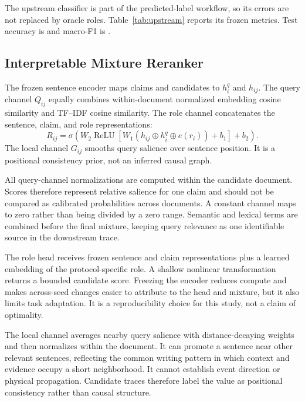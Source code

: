 \documentclass[applsci,article,submit,moreauthors]{Definitions/mdpi}
\begin{document}
The upstream classifier is part of the predicted-label workflow, so its errors are not replaced by oracle roles. Table~\ref{tab:upstream} reports its frozen metrics. Test accuracy is \UpstreamTestAccuracy{} and macro-F1 is \UpstreamTestMacroFOne{}.

\begin{table}[H]
\caption{Upstream role-prediction performance. All values are generated from the immutable metrics artifact.}\label{tab:upstream}
\centering\resizebox{\textwidth}{!}{}
\end{table}

\subsection{Interpretable Mixture Reranker}
The frozen sentence encoder maps claims and candidates to $h_i^q$ and $h_{ij}$. The query channel $Q_{ij}$ equally combines within-document normalized embedding cosine similarity and TF--IDF cosine similarity. The role channel concatenates the sentence, claim, and role representations:
\begin{equation}
R_{ij}=\sigma\!\left(W_2\operatorname{ReLU}\left[W_1(h_{ij}\oplus h_i^q\oplus e(r_i))+b_1\right]+b_2\right).
\end{equation}
The local channel $G_{ij}$ smooths query salience over sentence position. It is a positional consistency prior, not an inferred causal graph.

All query-channel normalizations are computed within the candidate document. Scores therefore represent relative salience for one claim and should not be compared as calibrated probabilities across documents. A constant channel maps to zero rather than being divided by a zero range. Semantic and lexical terms are combined before the final mixture, keeping query relevance as one identifiable source in the downstream trace.

The role head receives frozen sentence and claim representations plus a learned embedding of the protocol-specific role. A shallow nonlinear transformation returns a bounded candidate score. Freezing the encoder reduces compute and makes across-seed changes easier to attribute to the head and mixture, but it also limits task adaptation. It is a reproducibility choice for this study, not a claim of optimality.

The local channel averages nearby query salience with distance-decaying weights and then normalizes within the document. It can promote a sentence near other relevant sentences, reflecting the common writing pattern in which context and evidence occupy a short neighborhood. It cannot establish event direction or physical propagation. Candidate traces therefore label the value as positional consistency rather than causal structure.
\end{document}
